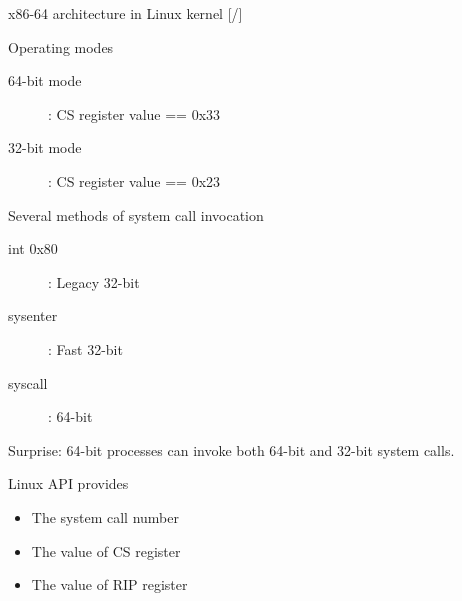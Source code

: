\documentclass[unicode,aspectratio=169,xcolor={table,dvipsnames,usernames}]{beamer}
\begin{document}
\begin{frame}{x86-64 architecture in Linux kernel \hfill [\insertframenumber/\inserttotalframenumber]}
\large
\begin{block}{Operating modes}
\begin{description}
	\item[64-bit mode]: CS register value == 0x33
	\item[32-bit mode]: CS register value == 0x23
\end{description}
\end{block}

\begin{block}{Several methods of system call invocation}
\begin{description}
	\item[int 0x80]: Legacy 32-bit
	\item[sysenter]: Fast 32-bit
	\item[syscall]: 64-bit
\end{description}
\end{block}

Surprise: 64-bit processes can invoke both 64-bit and 32-bit system calls.

\begin{block}{Linux API provides}
\begin{itemize}
	\item The system call number
	\item The value of CS register
	\item The value of RIP register
\end{itemize}
\end{block}
\end{frame}
\end{document}
